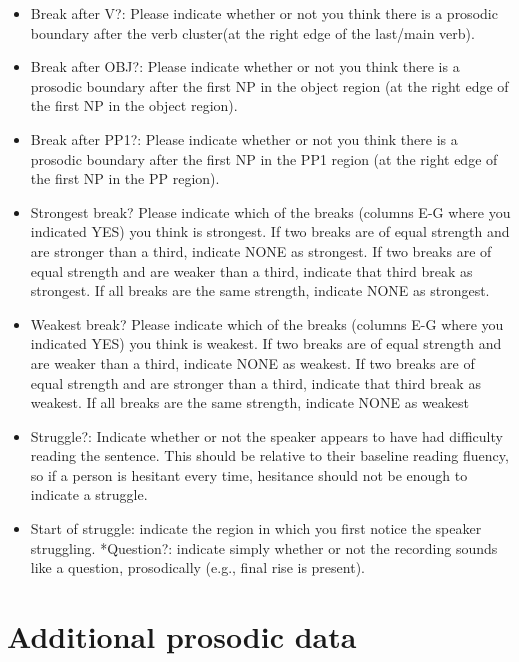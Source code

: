 \documentclass[11pt,oneside]{book}
\providecommand{\tightlist}{%
  \setlength{\itemsep}{0pt}\setlength{\parskip}{0pt}}
\begin{document}
\begin{itemize}
\tightlist
\item
  Break after V?: Please indicate whether or not you think there is a prosodic boundary after the verb cluster(at the right edge of the last/main verb).
\item
  Break after OBJ?: Please indicate whether or not you think there is a prosodic boundary after the first NP in the object region (at the right edge of the first NP in the object region).
\item
  Break after PP1?: Please indicate whether or not you think there is a prosodic boundary after the first NP in the PP1 region (at the right edge of the first NP in the PP region).
\item
  Strongest break? Please indicate which of the breaks (columns E-G where you indicated YES) you think is strongest. If two breaks are of equal strength and are stronger than a third, indicate NONE as strongest. If two breaks are of equal strength and are weaker than a third, indicate that third break as strongest. If all breaks are the same strength, indicate NONE as strongest.
\item
  Weakest break? Please indicate which of the breaks (columns E-G where you indicated YES) you think is weakest. If two breaks are of equal strength and are weaker than a third, indicate NONE as weakest. If two breaks are of equal strength and are stronger than a third, indicate that third break as weakest. If all breaks are the same strength, indicate NONE as weakest
\item
  Struggle?: Indicate whether or not the speaker appears to have had difficulty reading the sentence. This should be relative to their baseline reading fluency, so if a person is hesitant every time, hesitance should not be enough to indicate a struggle.
\item
  Start of struggle: indicate the region in which you first notice the speaker struggling.
  *Question?: indicate simply whether or not the recording sounds like a question, prosodically (e.g., final rise is present).
\end{itemize}

\clearpage

\hypertarget{additional-prosodic-data}{%
\chapter{Additional prosodic data}\label{additional-prosodic-data}}

\centering
\end{document}
